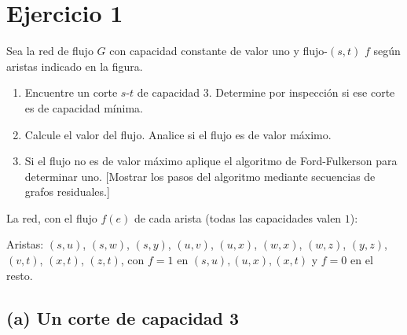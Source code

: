 \section{Ejercicio 1}
\begin{enunciado}
Sea la red de flujo $G$ con capacidad constante de valor uno y flujo-$(s,t)$ $f$ según aristas indicado en la figura.
\begin{enumerate}[label=(\alph*)]
\item Encuentre un corte $s$-$t$ de capacidad 3. Determine por inspección si ese corte es de capacidad mínima.
\item Calcule el valor del flujo. Analice si el flujo es de valor máximo.
\item Si el flujo no es de valor máximo aplique el algoritmo de Ford-Fulkerson para determinar uno. [Mostrar los pasos del algoritmo mediante secuencias de grafos residuales.]
\end{enumerate}
\end{enunciado}


La red, con el flujo $f(e)$ de cada arista (todas las capacidades valen $1$):

\begin{center}
\end{center}

Aristas: $(s,u)$, $(s,w)$, $(s,y)$, $(u,v)$, $(u,x)$, $(w,x)$, $(w,z)$, $(y,z)$, $(v,t)$, $(x,t)$, $(z,t)$, con $f=1$ en $(s,u),(u,x),(x,t)$ y $f=0$ en el resto.

\subsection*{(a) Un corte de capacidad 3}

